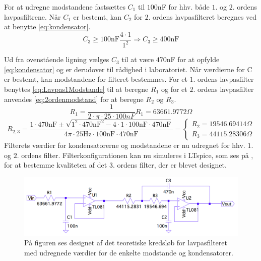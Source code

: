 \noindent For at udregne modstandene fastsættes $C_1$ til $100$nF for hhv. både $1$. og $2$. ordens lavpasfiltrene. Når $C_1$ er bestemt, kan $C_2$ for $2$. ordens lavpasfilteret beregnes ved at benytte \eqref{eq:kondensator}. %
\begin{equation}  
C_3 \geq 100\text{nF} \frac{4\cdot 1}{1^2} \Rightarrow C_3 \geq 400\text{nF}
\end{equation}

\noindent Ud fra ovenstående ligning vælges $C_3$ til at være $470$nF for at opfylde \eqref{eq:kondensator} og er derudover til rådighed i laboratoriet. Når værdierne for C er bestemt, kan modstandene for filteret bestemmes. For et $1$. ordens lavpasfilter benyttes \eqref{eq:Lavpas1Modstande} til at beregne $R_1$ og for et $2$. ordens lavpasfilter anvendes \eqref{eq:2ordenmodstand} for at beregne $R_2$ og $R_3$. 
\begin{equation} \label{eq:1ordenmodstand}
R_{1} = \frac{1}{2 \cdot \pi \cdot 25 \cdot 100nF} R_{1} = 63661.9772 \Omega
\end{equation}
\begin{equation}
\label{eq:2ordenmodstand}R_{2,3} = \frac{1 \cdot 470\text{nF} \pm \sqrt{1^2 \cdot 470\text{nF}^2 - 4 \cdot 1 \cdot 100\text{nF} \cdot 470\text{nF}}}{4 \pi \cdot 25\text{Hz} \cdot 100\text{nF} \cdot 470\text{nF}} = \begin{cases} R_{2} = 19546.69414 \Omega \\ R_{3} =  44115.28306 \Omega \end{cases}
\end{equation}
\noindent Filterets værdier for kondensatorerne og modstandene er nu udregnet for hhv. $1$. og $2$. ordens filter. Filterkonfigurationen kan nu simuleres i LTspice, som ses på , for at bestemme kvaliteten af det $3$. ordens filter, der er blevet designet.

\begin{figure}[H]
	\centering
	\includegraphics[scale=0.35]{figures/cProblemloesning/Lavpasfilter1_LTspice.PNG}
	\caption{På figuren ses designet af det teoretiske kredsløb for lavpasfilteret med udregnede værdier for de enkelte modstande og kondensatorer.}
	\label{fig:lavpasfilter1_LTspice}
\end{figure}

